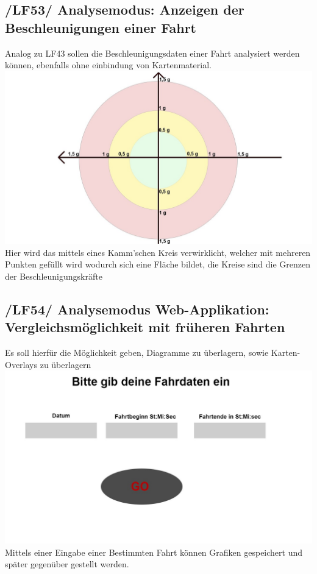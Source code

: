 \subsection{/LF53/ Analysemodus: Anzeigen der Beschleunigungen einer Fahrt }
\nextline
Analog zu LF43 sollen die Beschleunigungsdaten einer Fahrt analysiert werden können, ebenfalls ohne einbindung von Kartenmaterial.
\nextline
 \includegraphics[scale=0.3]{images/LF53_Kalm.jpg}
 \nextline
Hier wird das mittels eines Kamm'schen Kreis verwirklicht, welcher mit mehreren Punkten gefüllt wird wodurch sich eine Fläche bildet, die Kreise sind die Grenzen der Beschleunigungskräfte

\subsection{/LF54/ Analysemodus Web-Applikation: Vergleichsmöglichkeit mit früheren Fahrten}
\nextline
Es soll hierfür die Möglichkeit geben, Diagramme zu überlagern, sowie Karten-Overlays zu überlagern 
\nextline
 \includegraphics[scale=0.3]{images/LF54_Fahrdaten.jpg}
 \nextline
Mittels einer Eingabe einer Bestimmten Fahrt können Grafiken gespeichert und später gegenüber gestellt werden. 

